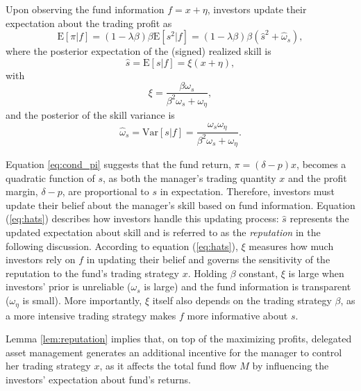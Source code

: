 \begin{lemma}\label{lem:reputation}
	Upon observing the fund information $f=x+\eta$, investors update their expectation about the trading profit as
	\begin{equation}
         \mathrm{E}\left[\pi|f\right] =(1-\lambda \beta)\beta\mathrm{E}[s^2|f]  = (1-\lambda \beta)\beta\left(\hat{s}^2 + \hat{\omega}_{s}\right),\label{eq:cond_pi}
     \end{equation}
     where the posterior expectation of the (signed) realized skill is
     \begin{equation}
         \hat{s} = \mathrm{E}[s|f] = \xi(x+\eta),\label{eq:hats}
     \end{equation}
     with 
	 \begin{equation}
		\xi = \frac{\beta\omega_{s}}{\beta^2 \omega_{s}+\omega_{\eta}},\label{eq:xi}
	 \end{equation}
	 and the posterior of the skill variance is
     \begin{equation}
         \hat{\omega}_{s} = \mathrm{Var}[s|f] = \frac{\omega_{s}\omega_{\eta}}{\beta^2 \omega_{s} + \omega_{\eta}}.\label{eq:cond_var}
     \end{equation}
 \end{lemma}
 Equation \eqref{eq:cond_pi} suggests that the fund return, $\pi=(\delta-p)x$, becomes a quadratic function of $s$, as both the manager's trading quantity $x$ and the profit margin, $\delta-p$, are proportional to $s$ in expectation. Therefore, investors must update their belief about the manager's skill based on fund information.
 Equation (\ref{eq:hats}) describes how investors handle this updating process: $\hat{s}$ represents the updated expectation about skill and is referred to as the \textit{reputation} in the following discussion. According to equation (\ref{eq:hats}), $\xi$ measures how much investors rely on $f$ in updating their belief and governs the sensitivity of the reputation to the fund's trading strategy $x$. Holding $\beta$ constant, $\xi$ is large when investors' prior is unreliable ($\omega_{s}$ is large) and the fund information is transparent ($\omega_{\eta}$ is small). More importantly, $\xi$ itself also depends on the trading strategy $\beta$, as a more intensive trading strategy makes $f$ more informative about $s$.

 Lemma \ref{lem:reputation} implies that, on top of the maximizing profits, delegated asset management generates an additional incentive for the manager to control her trading strategy $x$, as it affects the total fund flow $M$ by influencing the investors' expectation about fund's returns.

